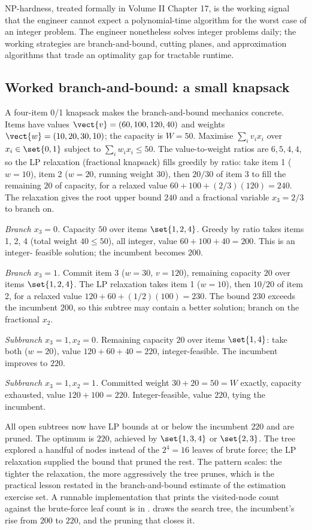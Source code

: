 NP-hardness, treated formally in Volume II Chapter 17, is the
working signal that the engineer cannot expect a polynomial-time
algorithm for the worst case of an integer problem. The engineer
nonetheless solves integer problems daily; the working strategies
are branch-and-bound, cutting planes, and approximation algorithms
that trade an optimality gap for tractable runtime.

\subsection{Worked branch-and-bound: a small knapsack}

A four-item 0/1 knapsack makes the branch-and-bound mechanics
concrete. Items have values $\vect{v} = (60, 100, 120, 40)$ and
weights $\vect{w} = (10, 20, 30, 10)$; the capacity is $W = 50$.
Maximise $\sum_{i} v_{i} x_{i}$ over $x_{i} \in \set{0, 1}$ subject
to $\sum_{i} w_{i} x_{i} \leq 50$. The value-to-weight ratios are
$6, 5, 4, 4$, so the LP relaxation (fractional knapsack) fills
greedily by ratio: take item 1 ($w = 10$), item 2 ($w = 20$,
running weight $30$), then $20/30$ of item 3 to fill the remaining
$20$ of capacity, for a relaxed value $60 + 100 + (2/3)(120) = 240$.
The relaxation gives the root upper bound $240$ and a fractional
variable $x_{3} = 2/3$ to branch on.

\emph{Branch $x_{3} = 0$.} Capacity $50$ over items $\set{1, 2, 4}$.
Greedy by ratio takes items 1, 2, 4 (total weight $40 \leq 50$),
all integer, value $60 + 100 + 40 = 200$. This is an integer-
feasible solution; the incumbent becomes $200$.

\emph{Branch $x_{3} = 1$.} Commit item 3 ($w = 30$, $v = 120$),
remaining capacity $20$ over items $\set{1, 2, 4}$. The LP
relaxation takes item 1 ($w = 10$), then $10/20$ of item 2, for a
relaxed value $120 + 60 + (1/2)(100) = 230$. The bound $230$
exceeds the incumbent $200$, so this subtree may contain a better
solution; branch on the fractional $x_{2}$.

\emph{Subbranch $x_{3} = 1, x_{2} = 0$.} Remaining capacity $20$
over items $\set{1, 4}$: take both ($w = 20$), value $120 + 60 +
40 = 220$, integer-feasible. The incumbent improves to $220$.

\emph{Subbranch $x_{3} = 1, x_{2} = 1$.} Committed weight $30 + 20
= 50 = W$ exactly, capacity exhausted, value $120 + 100 = 220$.
Integer-feasible, value $220$, tying the incumbent.

All open subtrees now have LP bounds at or below the incumbent
$220$ and are pruned. The optimum is $220$, achieved by
$\set{1, 3, 4}$ or $\set{2, 3}$. The tree explored a handful of nodes
instead of the $2^{4} = 16$ leaves of brute force; the LP
relaxation supplied the bound that pruned the rest. The pattern
scales: the tighter the relaxation, the more aggressively the tree
prunes, which is the practical lesson restated in the
branch-and-bound estimate of the estimation exercise set. A
runnable implementation that prints the visited-node count against
the brute-force leaf count is in
.
 draws the search tree, the
incumbent's rise from $200$ to $220$, and the pruning that closes it.

